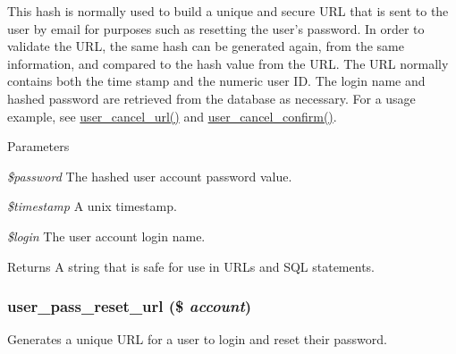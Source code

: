 This hash is normally used to build a unique and secure URL that is sent to the user by email for purposes such as resetting the user's password. In order to validate the URL, the same hash can be generated again, from the same information, and compared to the hash value from the URL. The URL normally contains both the time stamp and the numeric user ID. The login name and hashed password are retrieved from the database as necessary. For a usage example, see \hyperlink{user_8module_afdf3514e3f6d0c8de3f68ff5e98452c2}{user\_\-cancel\_\-url()} and \hyperlink{user_8pages_8inc_ac3ab92d15edab48212f460e0eabaafb6}{user\_\-cancel\_\-confirm()}.


\begin{DoxyParams}{Parameters}
\item[{\em \$password}]The hashed user account password value. \item[{\em \$timestamp}]A unix timestamp. \item[{\em \$login}]The user account login name.\end{DoxyParams}
\begin{DoxyReturn}{Returns}
A string that is safe for use in URLs and SQL statements. 
\end{DoxyReturn}
\hypertarget{user_8module_a99c0536278528e2b7d4fc0b9f7e2809d}{
\subsubsection[{user\_\-pass\_\-reset\_\-url}]{\setlength{\rightskip}{0pt plus 5cm}user\_\-pass\_\-reset\_\-url (\$ {\em account})}}
\label{user_8module_a99c0536278528e2b7d4fc0b9f7e2809d}
Generates a unique URL for a user to login and reset their password.


